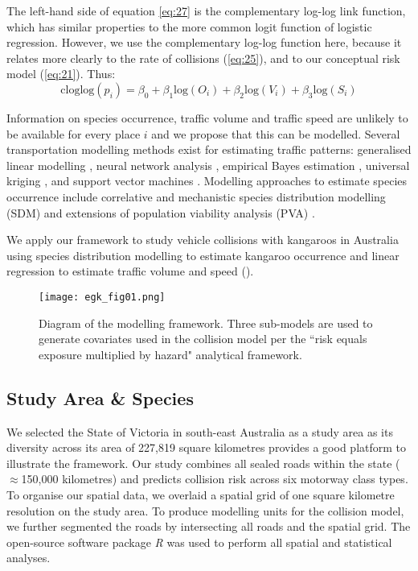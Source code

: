 The left-hand side of equation \ref{eq:27} is the complementary log-log link function, which has similar properties to the more common logit function of logistic regression. However, we use the complementary log-log function here, because it relates more clearly to the rate of collisions (\ref{eq:25}), and to our conceptual risk model (\ref{eq:21}). Thus: 
\begin{equation} \label{eq:28}
\text{cloglog}(p_i)=\beta_0+\beta_1\text{log}(O_i)+\beta_2\text{log}(V_i)+\beta_3\text{log}(S_i)
\end{equation}

Information on species occurrence, traffic volume and traffic speed are unlikely to be available for every place $i$ and we propose that this can be modelled. Several transportation modelling methods exist for estimating traffic patterns: generalised linear modelling \citep[e.g.][]{seav00,zhao01}, neural network analysis \citep[e.g.][]{dudd13}, empirical Bayes estimation \citep[e.g.][]{yang02}, universal kriging \citep[e.g.][]{eom06,selb13}, and support vector machines \citep[e.g.][]{cast09}. Modelling approaches to estimate species occurrence include correlative \citep[e.g.][]{guis05,elit09} and mechanistic \citep[e.g.][]{kear09} species distribution modelling (SDM) and extensions of population viability analysis (PVA) \citep[e.g.][]{gilp86,shaf90}.

We apply our framework to study vehicle collisions with kangaroos in Australia using species distribution modelling to estimate kangaroo occurrence and linear regression to estimate traffic volume and speed ().

\begin{figure*}[!h]
  \centering
  \texttt{[image: egk\_fig01.png]}
  \caption[Diagram of the modelling framework]{Diagram of the modelling framework. Three sub-models are used to generate covariates used in the collision model per the ``risk equals exposure multiplied by hazard" analytical framework.}
  \label{egk_framework}
\end{figure*}
 
\subsection{Study Area \& Species}

We selected the State of Victoria in south-east Australia as a study area as its diversity across its area of 227,819 square kilometres provides a good platform to illustrate the framework. Our study combines all sealed roads within the state ($\approx$150,000 kilometres) and predicts collision risk across six motorway class types. To organise our spatial data, we overlaid a spatial grid of one square kilometre resolution on the study area. To produce modelling units for the collision model, we further segmented the roads by intersecting all roads and the spatial grid. The open-source software package \textit{R} \citep{rdct16} was used to perform all spatial and statistical analyses.

